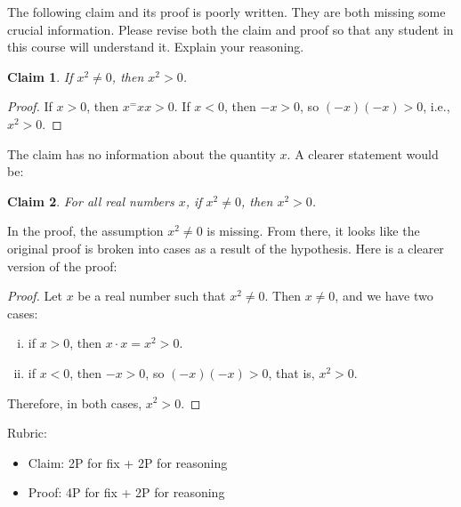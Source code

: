 \documentclass{article}
\newtheorem*{claim}{Claim}
\theoremstyle{definition}
\begin{document}
\begin{question}
   The following claim and its proof is poorly written. They are both missing some crucial information. 
   Please revise both the claim and proof so that any student in this course will understand it. Explain your reasoning.
      \begin{claim}
       If $x^2\neq 0$, then $x^2>0$.
      \end{claim}
      \begin{proof}
       If $x>0$, then $x^=xx>0$. If $x<0$, then $-x>0$, so $(-x)(-x)>0$, i.e., $x^2>0$.
      \end{proof}
\end{question}
\begin{solution}
    The claim has no information about the quantity $x$. A clearer statement would be:
        \begin{claim}
           For all real numbers $x$, if $x^2\neq 0$, then $x^2>0$.
        \end{claim}
    In the proof, the assumption $x^2\neq 0$ is missing. 
    From there, it looks like the original proof is broken into cases as a result of the hypothesis. 
    Here is a clearer version of the proof:
        \begin{proof}
           Let $x$ be a real number such that $x^2\neq 0$. Then $x\neq 0$, and we have two cases:
            \begin{enumerate}[i.]
                 \item if $x>0$, then $x\cdot x=x^2>0$.
                 \item if $x<0$, then $-x>0$, so $(-x)(-x)>0$, that is, $x^2>0$.
            \end{enumerate}
           Therefore, in both cases, $x^2>0$.
        \end{proof}

{\color{red} Rubric:
\begin{itemize}
\item Claim: 2P for fix + 2P for reasoning
\item Proof: 4P for fix + 2P for reasoning
\end{itemize}}
\end{solution}
\end{document}
